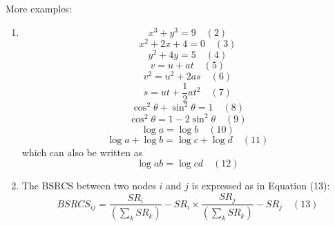 \documentclass{article}
\begin{document}
More examples:
\begin{enumerate}
    \item 
    \[
    x^3 + y^3 = 9 \quad (2)
    \]
    \[
    x^2 + 2x + 4 = 0 \quad (3)
    \]
    \[
    y^2 + 4y = 5 \quad (4)
    \]
    \[
    v = u + at \quad (5)
    \]
    \[
    v^2 = u^2 + 2as \quad (6)
    \]
    \[
    s = ut + \frac{1}{2} at^2 \quad (7)
    \]
    \[
    \cos^2 \theta + \sin^2 \theta = 1 \quad (8)
    \]
    \[
    \cos^2 \theta = 1 - 2\sin^2 \theta \quad (9)
    \]
    \[
    \log a = \log b \quad (10)
    \]
    \[
    \log a + \log b = \log c + \log d \quad (11)
    \]
    which can also be written as
    \[
    \log ab = \log cd \quad (12)
    \]
    
    \item The BSRCS between two nodes \(i\) and \(j\) is expressed as in Equation (13):
    \[
    BSRCS_{ij} = \frac{SR_i}{(\sum_{k} SR_k)} - SR_i \times \frac{SR_j}{(\sum_{k} SR_k)} - SR_j \quad (13)
    \]
\end{enumerate}
\end{document}
